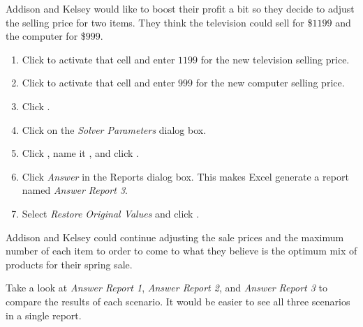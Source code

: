 Addison and Kelsey would like to boost their profit a bit so they decide to adjust the selling price for two items. They think the television could sell for \$$ 1199 $ and the computer for \$$ 999 $. 

\begin{enumerate}
	\item Click  to activate that cell and enter $ 1199 $ for the new television selling price.
	\item Click  to activate that cell and enter $ 999 $ for the new computer selling price.
	\item Click .
	\item Click  on the \textit{Solver Parameters} dialog box.
	\item Click , name it , and click .
	\item Click \textit{Answer} in the Reports dialog box. This makes Excel generate a report named \textit{Answer Report 3}.
	\item Select \textit{Restore Original Values} and click .
\end{enumerate}

Addison and Kelsey could continue adjusting the sale prices and the maximum number of each item to order to come to what they believe is the optimum mix of products for their spring sale.

Take a look at \textit{Answer Report 1}, \textit{Answer Report 2}, and \textit{Answer Report 3} to compare the results of each scenario. It would be easier to see all three scenarios in a single report.

